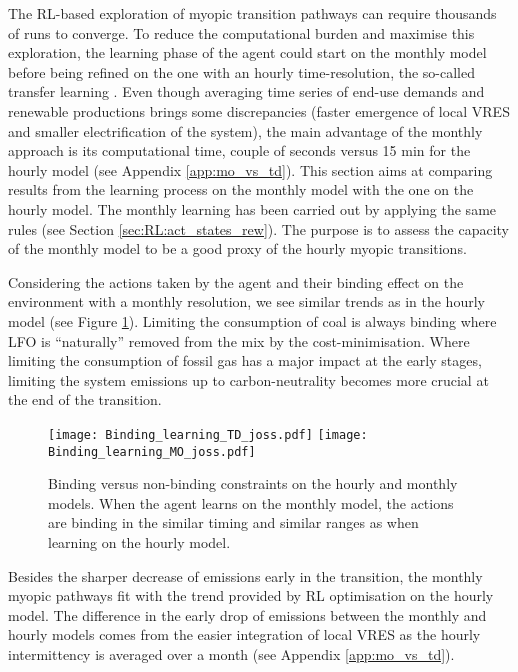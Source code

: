The \acrfull{RL}-based exploration of myopic transition pathways can require thousands of runs to converge. To reduce the computational burden and maximise this exploration, the learning phase of the agent could start on the monthly model before being refined on the one with an hourly time-resolution, the so-called transfer learning \cite{mann2013directed}.  Even though averaging time series of end-use demands and renewable productions brings some discrepancies (\ie faster emergence of local VRES and smaller electrification of the system), the main advantage of the monthly approach is its computational time, \ie couple of seconds versus 15 min for the hourly model (see Appendix \ref{app:mo_vs_td}). This section aims at comparing results from the learning process on the monthly model with the one on the hourly model. The monthly learning has been carried out by applying the same rules (see Section \ref{sec:RL:act_states_rew}). The purpose is to assess the capacity of the monthly model to be a good proxy of the hourly myopic transitions.

Considering the actions taken by the agent and their binding effect on the environment with a monthly resolution,  we see similar trends as in the hourly model (see Figure \ref{fig:app:Binding_constr_joss}). Limiting the consumption of coal is always binding where \gls{LFO} is ``naturally'' removed from the mix by the cost-minimisation. Where limiting the consumption of fossil gas has a major impact at the early stages, limiting the system emissions up to carbon-neutrality becomes more crucial at the end of the transition.

\begin{figure}[!htbp]
\centering
\texttt{[image: Binding\_learning\_TD\_joss.pdf]}
\texttt{[image: Binding\_learning\_MO\_joss.pdf]}
\caption{Binding versus non-binding constraints on the hourly and monthly models. When the agent learns on the monthly model, the actions are binding in the similar timing and similar ranges as when learning on the hourly model. }
\label{fig:app:Binding_constr_joss}
\end{figure} 

Besides the sharper decrease of emissions early in the transition, the monthly myopic pathways fit with the trend provided by \gls{RL} optimisation on the hourly model. The difference in the early drop of emissions between the monthly and hourly models comes from the easier integration of local \gls{VRES} as the hourly intermittency is averaged over a month (see Appendix \ref{app:mo_vs_td}). 

